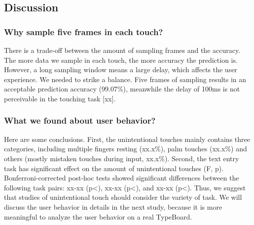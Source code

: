 \subsection{Discussion}

\subsubsection{Why sample five frames in each touch?} There is a trade-off between the amount of sampling frames and the accuracy. The more data we sample in each touch, the more accuracy the prediction is. However, a long sampling window means a large delay, which affects the user experience. We needed to strike a balance. Five frames of sampling results in an acceptable prediction accuracy (99.07\%), meanwhile the delay of 100ms is not perceivable in the touching task [xx].


\subsubsection{What we found about user behavior?} Here are some conclusions. First, the unintentional touches mainly contains three categories, including multiple fingers resting (xx.x\%), palm touches (xx.x\%) and others (mostly mistaken touches during input, xx.x\%). Second, the text entry task has significant effect on the amount of unintentional touches (F, p). Bonferroni-corrected post-hoc tests showed significant differences between the following task pairs: xx-xx (p<), xx-xx (p<), and xx-xx (p<). Thus, we suggest that studies of unintentional touch should consider the variety of task. We will discuss the user behavior in details in the next study, because it is more meaningful to analyze the user behavior on a real TypeBoard.

